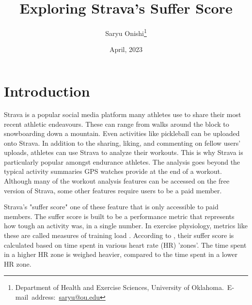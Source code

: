 \documentclass[12pt,english]{article}
\begin{document}
\begin{singlespace}
\title{Exploring Strava's Suffer Score}
\end{singlespace}

\author{Saryu Onishi\thanks{Department of Health and Exercise Sciences, University of Oklahoma.\
E-mail~address:~\href{mailto:saryu@ou.edu}{saryu@ou.edu}}}

\date{April, 2023}

\maketitle


\vfill{}


\pagebreak{}


\section{Introduction}\label{sec:intro}
Strava is a popular social media platform many athletes use to share their most recent athletic endeavours. These can range from walks around the block to snowboarding down a mountain. Even activities like pickleball can be uploaded onto Strava. In addition to the sharing, liking, and commenting on fellow users' uploads, athletes can use Strava to analyze their workouts. This is why Strava is particularly popular amongst endurance athletes. The analysis goes beyond the typical activity summaries GPS watches provide at the end of a workout. Although many of the workout analysis features can be accessed on the free version of Strava, some other features require users to be a paid member.

Strava's "suffer score" one of these feature that is only accessible to paid members. The suffer score is built to be a performance metric that represents how tough an activity was, in a single number. In exercise physiology, metrics like these are called measures of training load \cite{bourdon2017monitoring}. According to \cite{StravaSufferScore}, their suffer score is calculated based on time spent in various heart rate (HR) 'zones'. The time spent in a higher HR zone is weighed heavier, compared to the time spent in a lower HR zone. 
\end{document}
